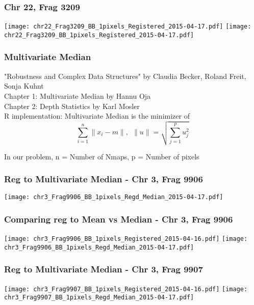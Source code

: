 \documentclass[10pt,dvipsnames,table]{beamer}
\begin{document}
\begin{frame}
\frametitle{Chr 22, Frag 3209}
\begin{center}
\texttt{[image: chr22\_Frag3209\_BB\_1pixels\_Registered\_2015-04-17.pdf]}
\texttt{[image: chr22\_Frag3209\_BB\_1pixels\_Registered\_2015-04-17.pdf]}
\end{center}
\end{frame}

\begin{frame}
\frametitle{Multivariate Median}

"Robustness and Complex Data Structures" by Claudia Becker, Roland Freit, Sonja Kuhnt \\

Chapter 1: Multivariate Median by Hannu Oja \\
Chapter 2: Depth Statistics by Karl Mosler \\

R implementation: Multivariate Median is the minimizer of 
\[ \sum\limits_{i=1}^n \|x_i - m\|, \ \ \|u\| = \sqrt{\sum\limits_{j=1}^p u_j^2 }  \]

In our problem, n = Number of Nmaps, p = Number of pixels
\end{frame}

\begin{frame}
\frametitle{Reg to Multivariate Median - Chr 3, Frag 9906}
\begin{center}
\texttt{[image: chr3\_Frag9906\_BB\_1pixels\_Regd\_Median\_2015-04-17.pdf]}
\end{center}
\end{frame}

\begin{frame}
\frametitle{Comparing reg to Mean vs Median - Chr 3, Frag 9906}
\begin{center}
\texttt{[image: chr3\_Frag9906\_BB\_1pixels\_Registered\_2015-04-16.pdf]}
\texttt{[image: chr3\_Frag9906\_BB\_1pixels\_Regd\_Median\_2015-04-17.pdf]}
\end{center}
\end{frame}

\begin{frame}
\frametitle{Reg to Multivariate Median - Chr 3, Frag 9907}
\begin{center}
\texttt{[image: chr3\_Frag9907\_BB\_1pixels\_Registered\_2015-04-16.pdf]}
\texttt{[image: chr3\_Frag9907\_BB\_1pixels\_Regd\_Median\_2015-04-17.pdf]}
\end{center}
\end{frame}
\end{document}
